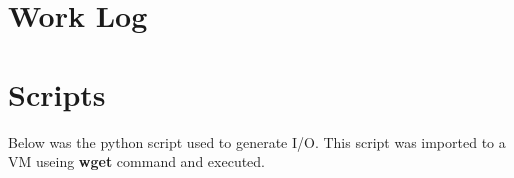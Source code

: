 \documentclass[10pt,onecolumn,draftclsnofoot]{IEEEtran} %
\begin{document}
\begin{singlespace}
\begin{enumerate}
	\end{enumerate}


\newpage
\section{\bf Work Log}

        \begin{center}
                
        \end{center}

\newpage


\section{\bf Scripts}
\normalfont \indent Below was the python script used to generate I/O. This script was imported to a VM useing \textbf{wget} command and executed.  




\end{singlespace}
\restoregeometry
\end{document}
